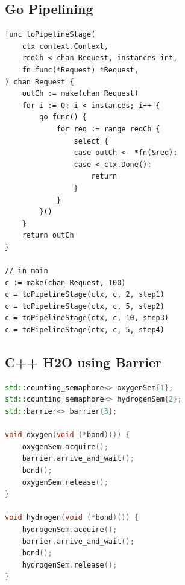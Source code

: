 \documentclass{article}
\begin{document}
\subsection{Go Pipelining}
\begin{lstlisting}[language=Golang]
func toPipelineStage(
    ctx context.Context,
    reqCh <-chan Request, instances int,
    fn func(*Request) *Request,
) chan Request {
    outCh := make(chan Request)
    for i := 0; i < instances; i++ {
        go func() {
            for req := range reqCh {
                select {
                case outCh <- *fn(&req):
                case <-ctx.Done():
                    return
                }
            }
        }()
    }
    return outCh
}

// in main
c := make(chan Request, 100)
c = toPipelineStage(ctx, c, 2, step1)
c = toPipelineStage(ctx, c, 5, step2)
c = toPipelineStage(ctx, c, 10, step3)
c = toPipelineStage(ctx, c, 5, step4)
\end{lstlisting}

\subsection{C++ H2O using Barrier}
\begin{lstlisting}[language=C++]
std::counting_semaphore<> oxygenSem{1};
std::counting_semaphore<> hydrogenSem{2};
std::barrier<> barrier{3};

void oxygen(void (*bond)()) {
    oxygenSem.acquire();
    barrier.arrive_and_wait();
    bond();
    oxygenSem.release();
}

void hydrogen(void (*bond)()) {
    hydrogenSem.acquire();
    barrier.arrive_and_wait();
    bond();
    hydrogenSem.release();
}
\end{lstlisting}
\end{document}
